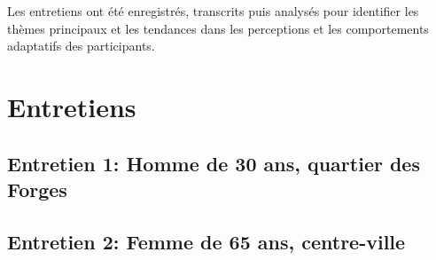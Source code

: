 \documentclass[11pt,a4paper]{article}
\begin{document}
Les entretiens ont été enregistrés, transcrits puis analysés pour identifier les thèmes principaux et les tendances dans les perceptions et les comportements adaptatifs des participants.

\section{Entretiens}

\subsection{Entretien 1: Homme de 30 ans, quartier des Forges}


\subsection{Entretien 2: Femme de 65 ans, centre-ville}

\end{document}
